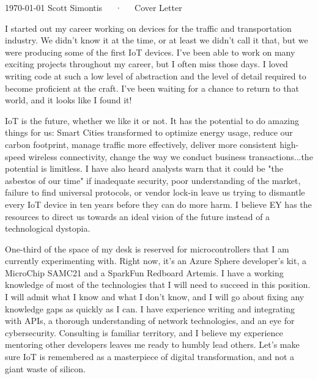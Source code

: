 \documentclass[11pt, letterpaper]{awesome-cv}
\begin{document}
\makecvheader[R]

\makecvfooter
  {\today}
  {Scott Simontis~~~·~~~Cover Letter}
  {}

\makelettertitle

\begin{cvletter}

I started out my career working on devices for the traffic and transportation industry. We didn't know it at the time, or at least we didn't call it that, but we were producing some of the first IoT devices. I've been able to work on many exciting projects throughout my career, but I often miss those days. I loved writing code at such a low level of abstraction and the level of detail required to become proficient at the craft. I've been waiting for a chance to return to that world, and it looks like I found it!

IoT is the future, whether we like it or not. It has the potential to do amazing things for us: Smart Cities transformed to optimize energy usage, reduce our carbon footprint, manage traffic more effectively, deliver more consistent high-speed wireless connectivity, change the way we conduct business transactions...the potential is limitless. I have also heard analysts warn that it could be "the asbestos of our time" if inadequate security, poor understanding of the market, failure to find universal protocols, or vendor lock-in leave us trying to dismantle every IoT device in ten years before they can do more harm. I believe EY has the resources to direct us towards an ideal vision of the future instead of a technological dystopia.

One-third of the space of my desk is reserved for microcontrollers that I am currently experimenting with. Right now, it's an Azure Sphere developer's kit, a MicroChip SAMC21 and a SparkFun Redboard Artemis. I have a working knowledge of most of the technologies that I will need to succeed in this position. I will admit what I know and what I don't know, and I will go about fixing any knowledge gaps as quickly as I can. I have experience writing and integrating with APIs, a thorough understanding of network technologies, and an eye for cybersecurity. Consulting is familiar territory, and I believe my experience mentoring other developers leaves me ready to humbly lead others. Let's make sure IoT is remembered as a masterpiece of digital transformation, and not a giant waste of silicon.

\end{cvletter}


\makeletterclosing
\end{document}
